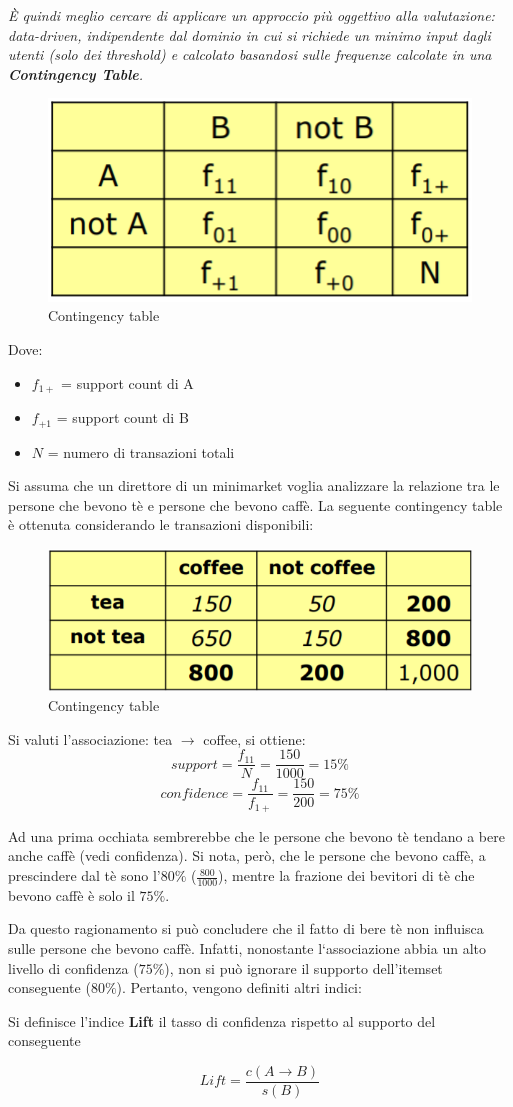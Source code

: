 \textit{\`E quindi meglio cercare di applicare un approccio più \textit{oggettivo} alla valutazione: data-driven, indipendente dal dominio in cui si richiede un minimo input dagli utenti (solo dei threshold) e calcolato basandosi sulle frequenze calcolate in una \textbf{Contingency Table}.}
\begin{figure}[H]
	\centering
	\includegraphics[height=0.2 \linewidth]{association/pict/contingency_table.png}
	\caption{Contingency table}
\end{figure}
Dove:
\begin{itemize}
	\item $f_{1+}$ = support count di A
	\item $f_{+1}$ = support count di B
	\item $N$ = numero di transazioni totali
\end{itemize}
Si assuma che un direttore di un minimarket voglia analizzare la relazione tra le persone che bevono tè e persone che bevono caffè. La seguente contingency table è ottenuta considerando le transazioni disponibili:
\begin{figure}[H]
	\centering
	\includegraphics[height=0.2 \linewidth]{association/pict/contingency_table_es.png}
	\caption{Contingency table}
\end{figure}

Si valuti l'associazione: tea $\rightarrow$ coffee, si ottiene:
	 \[support = \frac{f_{11}}{N} = \frac{150}{1000} = 15\%\]
	 \[confidence = \frac{f_{11}}{f_{1+}} = \frac{150}{200} = 75\%\]

Ad una prima occhiata sembrerebbe che le persone che bevono tè tendano a bere anche caffè (vedi confidenza). Si nota, però, che le persone che bevono caffè, a prescindere dal tè sono l'$80\%$ ($\frac{800}{1000}$), mentre la frazione dei bevitori di tè che bevono caffè è solo il $75\%$.

Da questo ragionamento si può concludere che il fatto di bere tè non influisca sulle persone che bevono caffè. Infatti, nonostante l`associazione abbia un alto livello di confidenza ($75\%$), non si può ignorare il supporto dell'itemset conseguente ($80\%$).
Pertanto, vengono definiti altri indici:
\begin{defn}
	Si definisce l'indice \textbf{Lift} il  tasso di confidenza rispetto al supporto del conseguente
	
	\[ Lift = \frac{c(A \rightarrow B)}{s(B)}\]
\end{defn}

